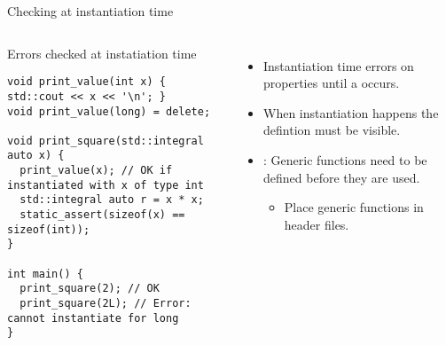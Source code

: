 \begin{frame}[t,fragile]{Checking at instantiation time}

\begin{columns}[T]


\begin{block}{Errors checked at instatiation time}
\begin{lstlisting}
void print_value(int x) { std::cout << x << '\n'; }
void print_value(long) = delete;

void print_square(std::integral auto x) {
  print_value(x); // OK if instantiated with x of type int
  std::integral auto r = x * x;
  static_assert(sizeof(x) == sizeof(int));
}

int main() {
  print_square(2); // OK
  print_square(2L); // Error: cannot instantiate for long
}
\end{lstlisting}
\end{block}


\pause
\begin{itemize}
  \item Instantiation time errors  on properties 
         until a  occurs.

  \item When instantiation happens the defintion must be visible.

  \item {}: Generic functions need to be 
        defined before they are used.
    \begin{itemize}
      \item Place generic functions in header files.
    \end{itemize}
\end{itemize}

\end{columns}

\end{frame}
